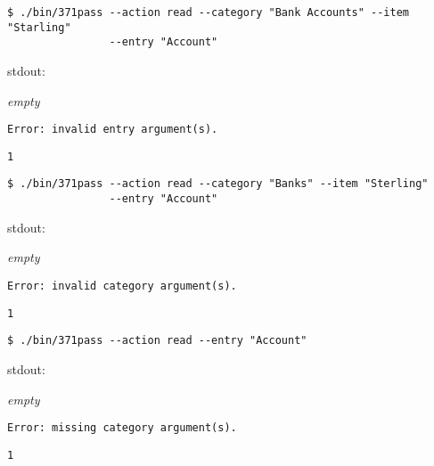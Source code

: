 \documentclass[a4paper]{article}
\begin{document}
\begin{Verbatim}[formatcom=\bfseries]
$ ./bin/371pass --action read --category "Bank Accounts" --item "Starling"
                --entry "Account"
\end{Verbatim}
\begin{labeling}{ stdout:}
    \item[stdout:]
    \emph{empty}
    
    \item[stderr:]
    \begin{lstlisting}[backgroundcolor = \color{lightgray},belowskip=0pt]
Error: invalid entry argument(s).
    \end{lstlisting}
    
    \item[exit:]
    \texttt{1}
\end{labeling}

\begin{Verbatim}[formatcom=\bfseries]
$ ./bin/371pass --action read --category "Banks" --item "Sterling"
                --entry "Account" 
\end{Verbatim}
\begin{labeling}{ stdout:}
    \item[stdout:]
    \emph{empty}
    
    \item[stderr:]
    \begin{lstlisting}[backgroundcolor = \color{lightgray},belowskip=0pt]
Error: invalid category argument(s).
    \end{lstlisting}
    
    \item[exit:]
    \texttt{1}
\end{labeling}

\begin{Verbatim}[formatcom=\bfseries]
$ ./bin/371pass --action read --entry "Account" 
\end{Verbatim}
\begin{labeling}{ stdout:}
    \item[stdout:]
    \emph{empty}
    
    \item[stderr:]
    \begin{lstlisting}[backgroundcolor = \color{lightgray},belowskip=0pt]
Error: missing category argument(s).
    \end{lstlisting}
    
    \item[exit:]
    \texttt{1}
\end{labeling}
\end{document}
